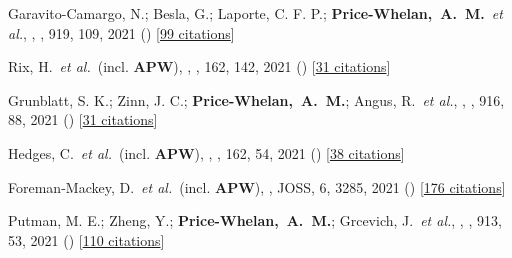 {\item[{\color{deemph}\scriptsize90}]Garavito-Camargo, N.; Besla, G.; Laporte, C. F. P.; \textbf{Price-Whelan,~A.~M.}~\textit{et al.}, , \apj, 919, 109, 2021 () [\href{http://adsabs.harvard.edu/abs/2021ApJ...919..109G}{99 citations}]

\item[{\color{deemph}\scriptsize89}]Rix, H.~\textit{et al.}~(incl. \textbf{APW}), , \aj, 162, 142, 2021 () [\href{http://adsabs.harvard.edu/abs/2021AJ....162..142R}{31 citations}]

\item[{\color{deemph}\scriptsize88}]Grunblatt, S. K.; Zinn, J. C.; \textbf{Price-Whelan,~A.~M.}; Angus, R.~\textit{et al.}, , \apj, 916, 88, 2021 () [\href{http://adsabs.harvard.edu/abs/2021ApJ...916...88G}{31 citations}]

\item[{\color{deemph}\scriptsize87}]Hedges, C.~\textit{et al.}~(incl. \textbf{APW}), , \aj, 162, 54, 2021 () [\href{http://adsabs.harvard.edu/abs/2021AJ....162...54H}{38 citations}]

\item[{\color{deemph}\scriptsize86}]Foreman-Mackey, D.~\textit{et al.}~(incl. \textbf{APW}), , JOSS, 6, 3285, 2021 () [\href{http://adsabs.harvard.edu/abs/2021JOSS....6.3285F}{176 citations}]

\item[{\color{deemph}\scriptsize85}]Putman, M. E.; Zheng, Y.; \textbf{Price-Whelan,~A.~M.}; Grcevich, J.~\textit{et al.}, , \apj, 913, 53, 2021 () [\href{http://adsabs.harvard.edu/abs/2021ApJ...913...53P}{110 citations}]

}
